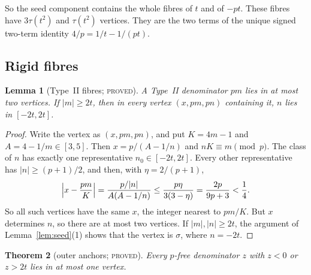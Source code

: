 \documentclass[11pt,reqno]{amsart}
\newtheorem{theorem}{Theorem}[section]
\newtheorem{lemma}[theorem]{Lemma}
\theoremstyle{definition}
\newcommand{\status}[1]{\textsc{#1}}
\begin{document}
So the seed component contains the whole fibres of $t$ and of $-pt$.  These
fibres have $3\tau(t^2)$ and $\tau(t^2)$ vertices.  They are the two terms
of the unique signed two-term identity $4/p=1/t-1/(pt)$.

\subsection{Rigid fibres}

\begin{lemma}[Type~II fibres; \status{proved}]\label{lem:typeII}
A Type~II denominator $pm$ lies in at most two vertices.  If $|m|\ge2t$,
then in every vertex $(x,pm,pn)$ containing it, $n$ lies in $[-2t,2t]$.
\end{lemma}

\begin{proof}
Write the vertex as $(x,pm,pn)$, and put $K=4m-1$ and $A=4-1/m\in[3,5]$.
Then $x=p/(A-1/n)$ and $nK\equiv m\pmod p$.  The class of $n$ has exactly one
representative $n_0\in[-2t,2t]$.  Every other representative has
$|n|\ge(p+1)/2$, and then, with $\eta=2/(p+1)$,
\[
 \Bigl|x-\frac{pm}{K}\Bigr|=\frac{p/|n|}{A(A-1/n)}\le
 \frac{p\eta}{3(3-\eta)}=\frac{2p}{9p+3}<\frac14 .
\]
So all such vertices have the same $x$, the integer nearest to $pm/K$.  But $x$
determines $n$, so there are at most two vertices.  If $|m|,|n|\ge2t$, the
argument of Lemma~\ref{lem:seed}(1) shows that the vertex is $\sigma$, where
$n=-2t$.
\end{proof}

\begin{theorem}[outer anchors; \status{proved}]\label{thm:outer}
Every $p$-free denominator $z$ with $z<0$ or $z>2t$ lies in at most one vertex.
\end{theorem}
\end{document}

